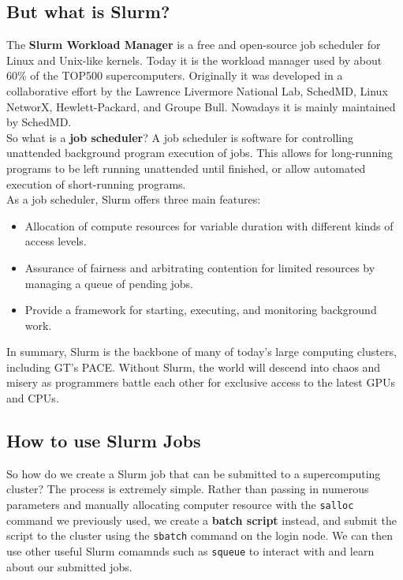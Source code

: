 \documentclass{article}
\begin{document}
\subsection{But what is Slurm?}

The \textbf{Slurm Workload Manager} is a free and open-source job scheduler for Linux and Unix-like kernels. Today it is the workload manager used by about 60\% of the TOP500 supercomputers. Originally it was developed in a collaborative effort by the Lawrence Livermore National Lab, SchedMD, Linux NetworX, Hewlett-Packard, and Groupe Bull. Nowadays it is mainly maintained by SchedMD. \\

\noindent So what is a \textbf{job scheduler}? A job scheduler is software for controlling unattended background program execution of jobs. This allows for long-running programs to be left running unattended until finished, or allow automated execution of short-running programs. \\ 

\noindent As a job scheduler, Slurm offers three main features:

\begin{itemize}
    \item Allocation of compute resources for variable duration with different kinds of access levels. 
    \item Assurance of fairness and arbitrating contention for limited resources by managing a queue of pending jobs.
    \item Provide a framework for starting, executing, and monitoring background work.   
\end{itemize}

\noindent In summary, Slurm is the backbone of many of today's large computing clusters, including GT's PACE. Without Slurm, the world will descend into chaos and misery as programmers battle each other for exclusive access to the latest GPUs and CPUs. 

\subsection{How to use Slurm Jobs}

So how do we create a Slurm job that can be submitted to a supercomputing cluster? The process is extremely simple. Rather than passing in numerous parameters and manually allocating computer resource with the \texttt{salloc} command we previously used, we create a \textbf{batch script} instead, and submit the script to the cluster using the \texttt{sbatch} command on the login node. We can then use other useful Slurm comamnds such as \texttt{squeue} to interact with and learn about our submitted jobs. \\
\end{document}

